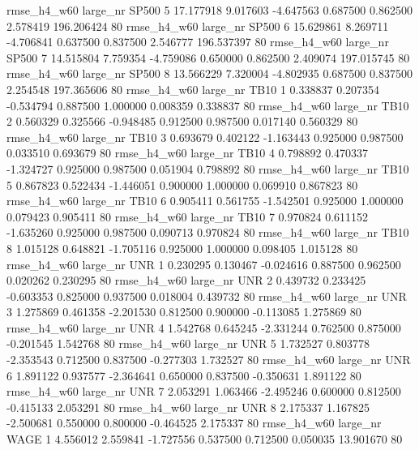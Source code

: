  rmse_h4_w60   large_nr    SP500                 5 17.177918  9.017603  -4.647563 0.687500 0.862500  2.578419  196.206424 80
 rmse_h4_w60   large_nr    SP500                 6 15.629861  8.269711  -4.706841 0.637500 0.837500  2.546777  196.537397 80
 rmse_h4_w60   large_nr    SP500                 7 14.515804  7.759354  -4.759086 0.650000 0.862500  2.409074  197.015745 80
 rmse_h4_w60   large_nr    SP500                 8 13.566229  7.320004  -4.802935 0.687500 0.837500  2.254548  197.365606 80
 rmse_h4_w60   large_nr     TB10                 1  0.338837  0.207354  -0.534794 0.887500 1.000000  0.008359    0.338837 80
 rmse_h4_w60   large_nr     TB10                 2  0.560329  0.325566  -0.948485 0.912500 0.987500  0.017140    0.560329 80
 rmse_h4_w60   large_nr     TB10                 3  0.693679  0.402122  -1.163443 0.925000 0.987500  0.033510    0.693679 80
 rmse_h4_w60   large_nr     TB10                 4  0.798892  0.470337  -1.324727 0.925000 0.987500  0.051904    0.798892 80
 rmse_h4_w60   large_nr     TB10                 5  0.867823  0.522434  -1.446051 0.900000 1.000000  0.069910    0.867823 80
 rmse_h4_w60   large_nr     TB10                 6  0.905411  0.561755  -1.542501 0.925000 1.000000  0.079423    0.905411 80
 rmse_h4_w60   large_nr     TB10                 7  0.970824  0.611152  -1.635260 0.925000 0.987500  0.090713    0.970824 80
 rmse_h4_w60   large_nr     TB10                 8  1.015128  0.648821  -1.705116 0.925000 1.000000  0.098405    1.015128 80
 rmse_h4_w60   large_nr      UNR                 1  0.230295  0.130467  -0.024616 0.887500 0.962500  0.020262    0.230295 80
 rmse_h4_w60   large_nr      UNR                 2  0.439732  0.233425  -0.603353 0.825000 0.937500  0.018004    0.439732 80
 rmse_h4_w60   large_nr      UNR                 3  1.275869  0.461358  -2.201530 0.812500 0.900000 -0.113085    1.275869 80
 rmse_h4_w60   large_nr      UNR                 4  1.542768  0.645245  -2.331244 0.762500 0.875000 -0.201545    1.542768 80
 rmse_h4_w60   large_nr      UNR                 5  1.732527  0.803778  -2.353543 0.712500 0.837500 -0.277303    1.732527 80
 rmse_h4_w60   large_nr      UNR                 6  1.891122  0.937577  -2.364641 0.650000 0.837500 -0.350631    1.891122 80
 rmse_h4_w60   large_nr      UNR                 7  2.053291  1.063466  -2.495246 0.600000 0.812500 -0.415133    2.053291 80
 rmse_h4_w60   large_nr      UNR                 8  2.175337  1.167825  -2.500681 0.550000 0.800000 -0.464525    2.175337 80
 rmse_h4_w60   large_nr     WAGE                 1  4.556012  2.559841  -1.727556 0.537500 0.712500  0.050035   13.901670 80
